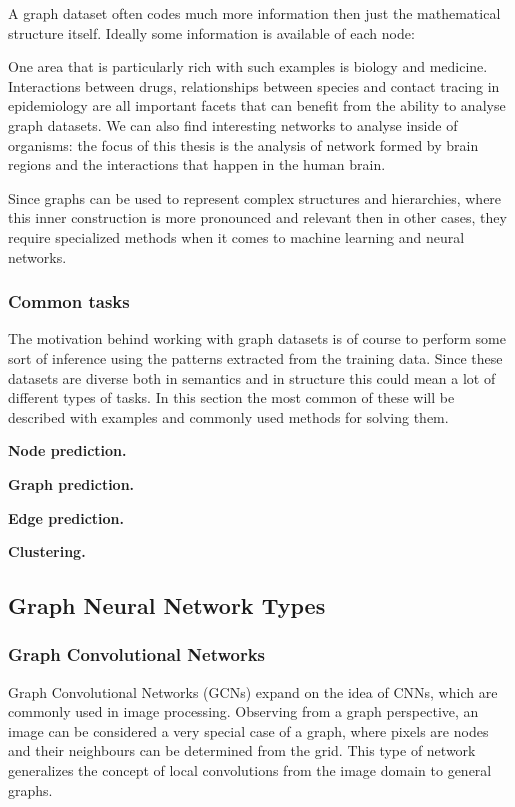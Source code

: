 	A graph dataset often codes much more information then just the mathematical structure itself. Ideally some information is available of each node: 
	
	One area that is particularly rich with such examples is biology and medicine. Interactions between drugs, relationships between species and contact tracing in epidemiology are all important facets that can benefit from the ability to analyse 
	graph datasets. We can also find interesting networks to analyse inside of organisms: the focus of this thesis is the analysis of network formed by brain regions and the interactions that happen in the human brain.
	
	Since graphs can be used to represent complex structures and hierarchies, where this inner construction is more pronounced and relevant then in other cases, they require specialized methods when it comes to machine learning and neural networks.
	
	
		\subsubsection{Common tasks}
		
		The motivation behind working with graph datasets is of course to perform some sort of inference using the patterns extracted from the training data. Since these datasets are diverse both in semantics and in structure this could mean a lot of different types of tasks. In this section the most common of these will be described with examples and commonly used methods for solving them.
		
		\textbf{Node prediction.}
		
		
		
		\textbf{Graph prediction.}
		
		\textbf{Edge prediction.}
		
		\textbf{Clustering.}
	
	\subsection{Graph Neural Network Types}
	
	
		\subsubsection{Graph Convolutional Networks}
		
		Graph Convolutional Networks (GCNs) expand on the idea of CNNs, which are commonly used in image processing. Observing from a graph perspective, an image can be considered a very special case of a graph, where pixels are nodes and their neighbours can be determined from the grid. This type of network generalizes the concept of local convolutions from the image domain to general graphs.
		
